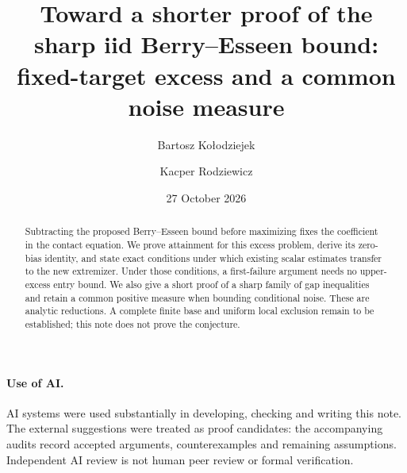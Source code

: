\documentclass[11pt,a4paper]{article}
\title{Toward a shorter proof of the sharp iid Berry--Esseen bound:\\
fixed-target excess and a common noise measure}
\author{Bartosz Ko{\l}odziejek \and Kacper Rodziewicz}
\date{27 October 2026}
\begin{document}
\maketitle
\begin{abstract}
Subtracting the proposed Berry--Esseen bound before maximizing fixes
the coefficient in the contact equation. We prove attainment for this
excess problem, derive its zero-bias identity, and state exact conditions
under which existing scalar estimates transfer to the new extremizer.
Under those conditions, a first-failure argument needs no upper-excess
entry bound. We also give a short proof of a sharp family of gap inequalities
and retain a common positive measure when bounding conditional noise.
These are analytic reductions. A complete finite base and uniform local
exclusion remain to be established; this note does not prove the conjecture.
\end{abstract}




\paragraph{Use of AI.}
AI systems were used substantially in developing, checking and writing
this note. The external suggestions were treated as proof candidates:
the accompanying audits record accepted arguments, counterexamples and
remaining assumptions. Independent AI review is not human peer review
or formal verification.


\end{document}
